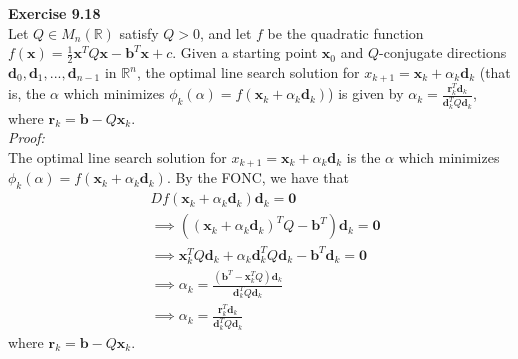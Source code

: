 \documentclass[letterpaper,12pt]{article}
\let\vec\mathbf
\theoremstyle{definition}
\begin{document}
\textbf{Exercise 9.18} \\
Let $Q \in M_n(\mathbb{R})$ satisfy $Q > 0$, and let $f$ be the quadratic function $f(\vec{x}) = \frac{1}{2}\vec{x}^TQ\vec{x} - \vec{b}^T\vec{x} + c$. Given a starting point $\vec{x}_0$ and $Q$-conjugate directions $\vec{d}_0, \vec{d}_1, ..., \vec{d}_{n-1}$ in $\mathbb{R}^n$, the optimal line search solution for $x_{k+1} = \vec{x}_k + \alpha_k \vec{d}_k$ (that is, the $\alpha$ which minimizes $\phi_k(\alpha) = f(\vec{x}_k+\alpha_k \vec{d}_k)$) is given by $\alpha_k = \frac{\vec{r}_k^T \vec{d}_k}{\vec{d}_k^T Q \vec{d}_k}$, where $\vec{r}_k = \vec{b} - Q\vec{x}_k$. \\
\textit{Proof:} \\
The optimal line search solution for $x_{k+1} = \vec{x}_k + \alpha_k \vec{d}_k$ is the $\alpha$ which minimizes $\phi_k(\alpha) = f(\vec{x}_k+\alpha_k \vec{d}_k)$. By the FONC, we have that
\begin{align*}
  &Df(\vec{x}_k+\alpha_k \vec{d}_k)\vec{d}_k = \vec{0}
  \\
  &\implies ((\vec{x}_k+\alpha_k \vec{d}_k)^TQ - \vec{b}^T)\vec{d}_k = \vec{0}
  \\
  &\implies \vec{x}_k^TQ\vec{d}_k + \alpha_k\vec{d}_k^T Q \vec{d}_k - \vec{b}^T\vec{d}_k = \vec{0}
  \\
  &\implies \alpha_k = \frac{(\vec{b}^T - \vec{x}_k^TQ)\vec{d}_k}{\vec{d}_k^T Q \vec{d}_k}
  \\
  &\implies \alpha_k = \frac{\vec{r}_k^T \vec{d}_k}{\vec{d}_k^T Q \vec{d}_k}
\end{align*}
where $\vec{r}_k = \vec{b} - Q\vec{x}_k$. \\
\end{document}
